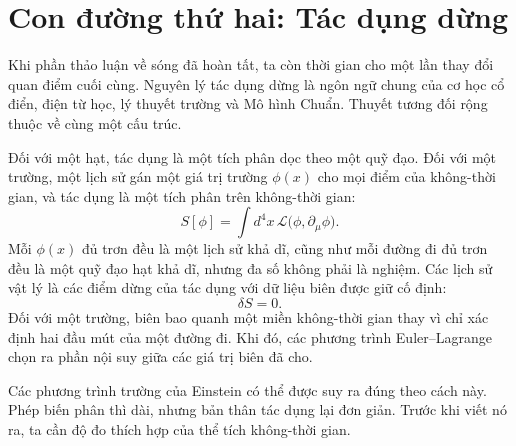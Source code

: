 \begin{classroomqa}
\end{classroomqa}

\section{Con đường thứ hai: Tác dụng dừng}

Khi phần thảo luận về sóng đã hoàn tất, ta còn thời gian cho một lần thay đổi quan điểm cuối cùng. Nguyên lý tác dụng dừng là ngôn ngữ chung của cơ học cổ điển, điện từ học, lý thuyết trường và Mô hình Chuẩn. Thuyết tương đối rộng thuộc về cùng một cấu trúc.

Đối với một hạt, tác dụng là một tích phân dọc theo một quỹ đạo. Đối với một trường, một lịch sử gán một giá trị trường \(\phi(x)\) cho mọi điểm của không-thời gian, và tác dụng là một tích phân trên không-thời gian:
\begin{equation}
 S[\phi]
 =\int d^4x\,
 \mathcal L\bigl(\phi,\partial_\mu\phi\bigr).
 \label{eq:field-action}
\end{equation}
Mỗi \(\phi(x)\) đủ trơn đều là một lịch sử khả dĩ, cũng như mỗi đường đi đủ trơn đều là một quỹ đạo hạt khả dĩ, nhưng đa số không phải là nghiệm. Các lịch sử vật lý là các điểm dừng của tác dụng với dữ liệu biên được giữ cố định:
\begin{equation}
 \delta S=0.
 \label{eq:stationary-action}
\end{equation}
Đối với một trường, biên bao quanh một miền không-thời gian thay vì chỉ xác định hai đầu mút của một đường đi. Khi đó, các phương trình Euler--Lagrange chọn ra phần nội suy giữa các giá trị biên đã cho.

Các phương trình trường của Einstein có thể được suy ra đúng theo cách này. Phép biến phân thì dài, nhưng bản thân tác dụng lại đơn giản. Trước khi viết nó ra, ta cần độ đo thích hợp của thể tích không-thời gian.

